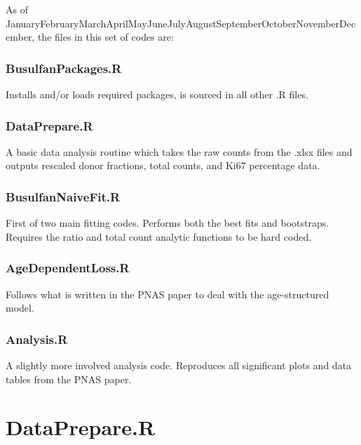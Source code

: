 \documentclass{tufte-book} %
\newcommand{\monthyear}{\ifcase\month\or January\or February\or March\or April\or May\or June\or July\or August\or September\or October\or November\or December\fi\space\number\year} %
\begin{document}
\begin{fullwidth}
As of \monthyear, the files in this set of codes are:
\subsection{BusulfanPackages.R}
Installs and/or loads required packages, is sourced in all other .R files.

\subsection{DataPrepare.R}
A basic data analysis routine which takes the raw counts from the .xlsx files and outputs rescaled donor fractions, total counts, and Ki67 percentage data.

\subsection{BusulfanNaiveFit.R}
First of two main fitting codes. Performs both the best fits and bootstraps. Requires the ratio and total count analytic functions to be hard coded.

\subsection{AgeDependentLoss.R}
Follows what is written in the PNAS paper to deal with the age-structured model.

\subsection{Analysis.R}
A slightly more involved analysis code. Reproduces all significant plots and data tables from the PNAS paper.

\end{fullwidth}



\mainmatter


\chapter{DataPrepare.R}
\label{ch:1}
\end{document}
